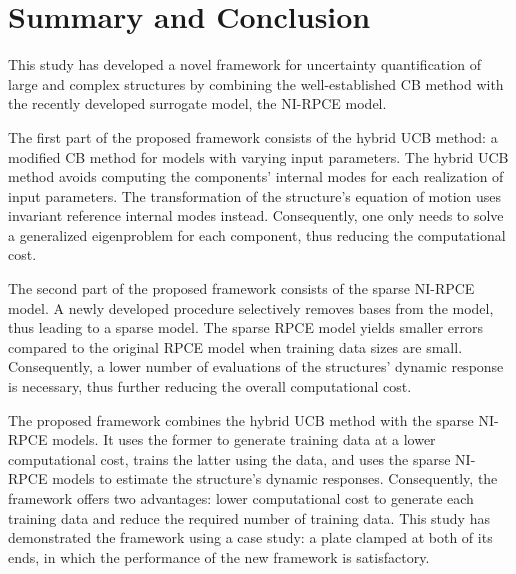 %
%

\chapter{Summary and Conclusion}
\label{ch: conclusion}

This study has developed a novel framework for uncertainty quantification of large and complex structures by combining the well-established CB method with the recently developed surrogate model, the NI-RPCE model.

The first part of the proposed framework consists of the hybrid UCB method: a modified CB method for models with varying input parameters.
The hybrid UCB method avoids computing the components' internal modes for each realization of input parameters.
The transformation of the structure's equation of motion uses invariant reference internal modes instead.
Consequently, one only needs to solve a generalized eigenproblem for each component, thus reducing the computational cost.

The second part of the proposed framework consists of the sparse NI-RPCE model.
A newly developed procedure selectively removes bases from the model, thus leading to a sparse model.
The sparse RPCE model yields smaller errors compared to the original RPCE model when training data sizes are small.
Consequently, a lower number of evaluations of the structures' dynamic response is necessary, thus further reducing the overall computational cost.

The proposed framework combines the hybrid UCB method with the sparse NI-RPCE models.
It uses the former to generate training data at a lower computational cost, trains the latter using the data, and uses the sparse NI-RPCE models to estimate the structure's dynamic responses.
Consequently, the framework offers two advantages: lower computational cost to generate each training data and reduce the required number of training data.
This study has demonstrated the framework using a case study: a plate clamped at both of its ends, in which the performance of the new framework is satisfactory.